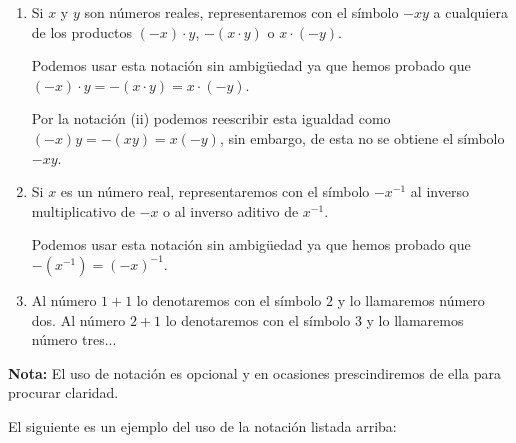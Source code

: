 \documentclass[11pt]{article}
\begin{document}
\begin{enumerate}[label=\roman*)]
\item Si $x$ y $y$ son números reales, representaremos con el símbolo $-xy$ a cualquiera de los productos $(-x)\cdot y$, $-(x \cdot y)$ o $x\cdot (-y)$.

Podemos usar esta notación sin ambigüedad ya que hemos probado que $(-x)\cdot y = -(x \cdot y)=x\cdot (-y)$.

Por la notación (ii) podemos reescribir esta igualdad como $(-x)y=-(xy)=x(-y)$, sin embargo, de esta no se obtiene el símbolo $-xy$.

\item Si $x$ es un número real, representaremos con el símbolo $-x^{-1}$ al inverso multiplicativo de $-x$ o al inverso aditivo de $x^{-1}$.
    
Podemos usar esta notación sin ambigüedad ya que hemos probado que $-(x^{-1})=(-x)^{-1}$.
%
%
%

\item Al número $1+1$ lo denotaremos con el símbolo $2$ y lo llamaremos número dos. Al número $2+1$ lo denotaremos con el símbolo $3$ y lo llamaremos número tres...
\end{enumerate}


\textbf{Nota:} El uso de notación es opcional y en ocasiones prescindiremos de ella para procurar claridad.%

El siguiente es un ejemplo del uso de la notación listada arriba:
\end{document}
